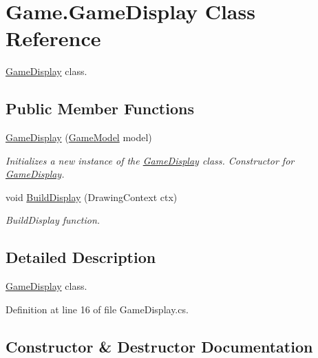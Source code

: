 \hypertarget{class_game_1_1_game_display}{}\section{Game.\+Game\+Display Class Reference}
\label{class_game_1_1_game_display}


\mbox{\hyperlink{class_game_1_1_game_display}{Game\+Display}} class.  


\subsection*{Public Member Functions}
\begin{DoxyCompactItemize}
\item 
\mbox{\hyperlink{class_game_1_1_game_display_a893b3858b47d0246a0480b964b9acb3d}{Game\+Display}} (\mbox{\hyperlink{class_game_1_1_game_model}{Game\+Model}} model)
\begin{DoxyCompactList}\small\item\em Initializes a new instance of the \mbox{\hyperlink{class_game_1_1_game_display}{Game\+Display}} class. Constructor for \mbox{\hyperlink{class_game_1_1_game_display}{Game\+Display}}. \end{DoxyCompactList}\item 
void \mbox{\hyperlink{class_game_1_1_game_display_a9dfba504af8f3a89c393519a4ad88c7f}{Build\+Display}} (Drawing\+Context ctx)
\begin{DoxyCompactList}\small\item\em Build\+Display function. \end{DoxyCompactList}\end{DoxyCompactItemize}


\subsection{Detailed Description}
\mbox{\hyperlink{class_game_1_1_game_display}{Game\+Display}} class. 



Definition at line 16 of file Game\+Display.\+cs.



\subsection{Constructor \& Destructor Documentation}
\mbox{\label{class_game_1_1_game_display_a893b3858b47d0246a0480b964b9acb3d}} 
